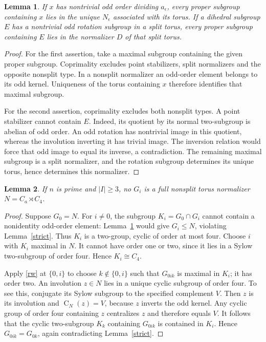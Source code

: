 \documentclass[11pt,a4paper]{article}
\newtheorem{lemma}{Lemma}
\newcommand{\C}{\operatorname{C}}
\begin{document}
\begin{lemma}\label{overgroups}
If $x$ has nontrivial odd order dividing $a_\epsilon$, every proper
subgroup containing $x$ lies in the unique $N_\epsilon$ associated
with its torus. If a dihedral subgroup $E$ has a nontrivial odd rotation
subgroup in a split torus, every proper subgroup containing $E$ lies in
the normalizer $D$ of that split torus.
\end{lemma}
\begin{proof}
For the first assertion, take a maximal subgroup containing the given
proper subgroup. Coprimality excludes point stabilizers, split
normalizers and the opposite nonsplit type. In a nonsplit normalizer
an odd-order element belongs to its odd kernel. Uniqueness of the torus
containing $x$ therefore identifies that maximal subgroup.

For the second assertion, coprimality excludes both nonsplit types.
A point stabilizer cannot contain $E$. Indeed, its quotient by its
normal two-subgroup is abelian of odd order. An odd rotation has
nontrivial image in this quotient, whereas the involution inverting it
has trivial image. The inversion relation would force that odd image
to equal its inverse, a contradiction. The remaining maximal subgroup
is a split normalizer, and the rotation subgroup determines its unique
torus, hence determines this normalizer.
\end{proof}

\begin{lemma}\label{nonsplit}
If $n$ is prime and $|I|\ge3$, no $G_i$ is a full nonsplit torus
normalizer $N=C_a\rtimes C_4$.
\end{lemma}
\begin{proof}
Suppose $G_0=N$. For $i\ne0$, the subgroup $K_i=G_0\cap G_i$
cannot contain a nonidentity odd-order element: Lemma~\ref{overgroups}
would give $G_i\le N$, violating Lemma~\ref{strict}. Thus $K_i$ is
a two-group, cyclic of order at most four. Choose $i$ with $K_i$
maximal in $N$. It cannot have order one or two, since it lies in a
Sylow two-subgroup of order four. Hence $K_i\cong C_4$.

Apply \eqref{rw} at $\{0,i\}$ to choose $k\notin\{0,i\}$ such
that $G_{0ik}$ is maximal in $K_i$; it has order two. An involution
$z\in N$ lies in a unique cyclic subgroup of order four. To see this,
conjugate its Sylow subgroup to the specified complement $V$. Then
$z$ is its involution and $\C_N(z)=V$, because $z$ inverts the odd
kernel. Any cyclic group of order four containing $z$ centralizes $z$
and therefore equals $V$.
It follows that the cyclic two-subgroup $K_k$ containing $G_{0ik}$
is contained in $K_i$. Hence $G_{0ik}=G_{0k}$, again contradicting
Lemma~\ref{strict}.
\end{proof}
\end{document}
